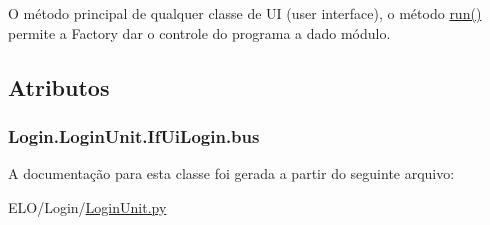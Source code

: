 O método principal de qualquer classe de U\-I (user interface), o método \hyperlink{classLogin_1_1LoginUnit_1_1IfUiLogin_ac6250c19afa63158907c6e8b4ff6dbd5}{run()} permite a Factory dar o controle do programa a dado módulo. 



\subsection{Atributos}
\hypertarget{classLogin_1_1LoginUnit_1_1IfUiLogin_af6823ae4c77d340c2341932d8f338753}{
\subsubsection[{bus}]{\setlength{\rightskip}{0pt plus 5cm}Login.\-Login\-Unit.\-If\-Ui\-Login.\-bus}}\label{classLogin_1_1LoginUnit_1_1IfUiLogin_af6823ae4c77d340c2341932d8f338753}


A documentação para esta classe foi gerada a partir do seguinte arquivo\-:\begin{DoxyCompactItemize}
\item 
E\-L\-O/\-Login/\hyperlink{LoginUnit_8py}{Login\-Unit.\-py}\end{DoxyCompactItemize}
